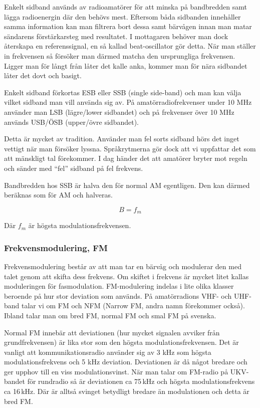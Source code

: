 Enkelt sidband används av radioamatörer för att minska på bandbredden samt lägga radioenergin där den behövs mest. Eftersom båda sidbanden innehåller samma information kan man filtrera bort dessa samt bärvågen innan man matar sändarens förstärkarsteg med resultatet. I mottagaren behöver man dock återskapa en referenssignal, en så kallad beat-oscillator gör detta. När man ställer in frekvensen så försöker man därmed matcha den ursprungliga frekvensen. Ligger man för långt från låter det kalle anka, kommer man för nära sidbandet låter det dovt och basigt. 

Enkelt sidband förkortas ESB eller SSB (single side-band) och man kan välja vilket sidband man vill använda sig av. På amatörradiofrekvenser under 10 MHz använder man LSB (lägre/lower sidbandet) och på frekvenser över 10 MHz används USB/ÖSB (upper/övre sidbandet). 

Detta är mycket av tradition. Använder man fel sorts sidband hörs det inget vettigt när man försöker lyssna. Språkrytmerna gör dock att vi uppfattar det som att mänskligt tal förekommer. I dag händer det att amatörer bryter mot regeln och sänder med ``fel'' sidband på fel frekvens.

Bandbredden hos SSB är halva den för normal AM egentligen. Den kan därmed beräknas som för AM och halveras.

$$B=f_m$$

Där $f_m$ är högsta modulationsfrekvensen.

\subsubsection{Frekvensmodulering, FM}

Frekvensmodulering består av att man tar en bärvåg och modulerar den med talet genom att skifta dess frekvens. Om skiftet i frekvens är mycket litet kallas moduleringen för fasmodulation. FM-modulering indelas i lite olika klasser beroende på hur stor deviation som används. På amatörradions VHF- och UHF-band talar vi om FM och NFM (Narrow FM, andra namn förekommer också). Ibland talar man om bred FM, normal FM och smal FM på svenska.

Normal FM innebär att deviationen (hur mycket signalen avviker från grundfrekvensen) är lika stor som den högsta modulationsfrekvensen. Det är vanligt att kommunikationsradio använder sig av 3 kHz som högsta modulationsfrekvens och 5 kHz deviation. Deviationen är då något bredare och ger upphov till en viss modulationsvinst. När man talar om FM-radio på UKV-bandet för rundradio så är deviationen ca 75\,kHz och högsta modulationsfrekvens ca 16\,kHz. Där är alltså svinget betydligt bredare än modulationen och detta är bred FM.

